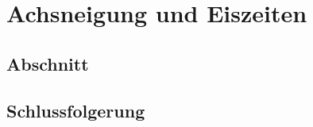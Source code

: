 %
%
%
\chapter{Achsneigung und Eiszeiten\label{chapter:thema}}
\begin{refsection}

\section{Abschnitt}

\section{Schlussfolgerung}

\printbibliography[heading=subbibliography]
\end{refsection}
